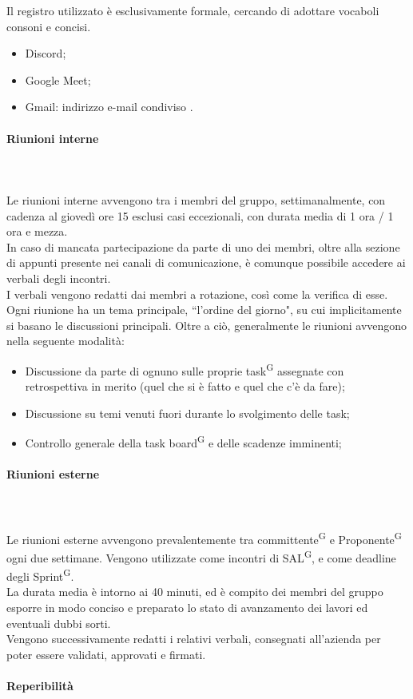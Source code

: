 \documentclass[8pt]{article}
\newcommand{\glossterm}[1]{#1\textsuperscript{G}} %
\newcommand{\subsubsubsection}[1]{\paragraph{#1}\mbox{}\\}
\begin{document}
Il registro utilizzato è esclusivamente formale, cercando di adottare vocaboli consoni e concisi.
\begin{itemize}
  \item Discord;
  \item Google Meet;
  \item Gmail: indirizzo e-mail condiviso
      \href{nan1fyteam.unipd@gmail.com}{\color{black}{nan1fyteam.unipd@gmail.com}}.
\end{itemize}
\subsubsubsection{Riunioni interne}\\
Le riunioni interne avvengono tra i membri del gruppo, settimanalmente, con cadenza al giovedì ore 15 esclusi casi eccezionali, con durata media di 1 ora / 1 ora e mezza.\\
In caso di mancata partecipazione da parte di uno dei membri, oltre alla sezione di appunti presente nei canali di comunicazione, è comunque possibile accedere ai verbali degli incontri.\\
I verbali vengono redatti dai membri a rotazione, così come la verifica di esse.\\
Ogni riunione ha un tema principale, ``l'ordine del giorno", su cui implicitamente si basano le discussioni principali.
Oltre a ciò, generalmente le riunioni avvengono nella seguente modalità:
\begin{itemize}
  \item Discussione da parte di ognuno sulle proprie \glossterm{task} assegnate con retrospettiva in merito
      (quel che si è fatto e quel che c'è da fare);
  \item Discussione su temi venuti fuori durante lo svolgimento delle task;
  \item Controllo generale della task \glossterm{board} e delle scadenze imminenti;
\end{itemize}
\subsubsubsection{Riunioni esterne}\\
Le riunioni esterne avvengono prevalentemente tra \glossterm{committente} e \glossterm{Proponente} ogni due
settimane. Vengono utilizzate come incontri di \glossterm{SAL}, e come deadline degli \glossterm{Sprint}.\\
La durata media è intorno ai 40 minuti, ed è compito dei membri del gruppo esporre in modo conciso e preparato lo stato di avanzamento dei lavori ed eventuali dubbi sorti.\\
Vengono successivamente redatti i relativi verbali, consegnati all'azienda per poter essere validati, approvati e firmati.
\subsubsubsection{Reperibilità}\\
\end{document}
